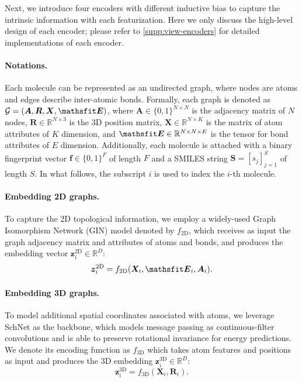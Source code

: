Next, we introduce four encoders with different inductive bias to capture the intrinsic information with each featurization.
Here we only discuss the high-level design of each encoder; please refer to \cref{supp:view-encoders} for detailed implementations of each encoder.

\paragraph{Notations.}
Each molecule can be represented as an undirected graph, where nodes are atoms and edges describe inter-atomic bonds.
Formally, each graph is denoted as \(\mathcal{G} = (\bm{A}, \bm{R}, \bm{X}, \tens{E})\), where \(\bm{A} \in \{0,1\}^{N\times N}\) is the adjacency matrix of \(N\) nodes, \(\bm{R} \in \mathbb{R}^{N \times 3}\) is the 3D position matrix, \(\bm{X} \in \mathbb{R}^{N \times K}\) is the matrix of atom attributes of \(K\) dimension, and \(\tens{E} \in \mathbb{R}^{N \times N \times E}\) is the tensor for bond attributes of \(E\) dimension.
Additionally, each molecule is attached with a binary fingerprint vector \(\bm{f} \in \{0, 1\}^{F}\) of length \(F\) and a SMILES string \(\mathbf{S} = [s_j]_{j=1}^{S}\) of length \(S\).
In what follows, the subscript \(i\) is used to index the \(i\)-th molecule.

\paragraph{Embedding 2D graphs.}
To capture the 2D topological information, we employ a widely-used Graph Isomorphism Network (GIN) model \cite{Xu:2019ty} denoted by \(f_\text{2D}\), which receives as input the graph adjacency matrix and attributes of atoms and bonds, and produces the embedding vector \(\bm{z}^\text{2D}_i \in \mathbb{R}^{D}\):
\begin{equation}
	\bm{z}^\text{2D}_i = f_\text{2D}(\bm{X}_i, \tens{E}_i, \bm{A}_i).
\end{equation}

\paragraph{Embedding 3D graphs.}
To model additional spatial coordinates associated with atoms, we leverage SchNet \cite{Schutt:2017wh} as the backbone, which models message passing as continuous-filter convolutions and is able to preserve rotational invariance for energy predictions.
We denote its encoding function as \(f_\text{3D}\) which takes atom features and positions as input and produces the 3D embedding \(\bm{z}^\text{3D}_i \in \mathbb{R}^{D}\):
\begin{equation}
	\bm{z}^\text{3D}_i = f_\text{3D}(\bm{X}_i, \bm{R}_i).
\end{equation}

